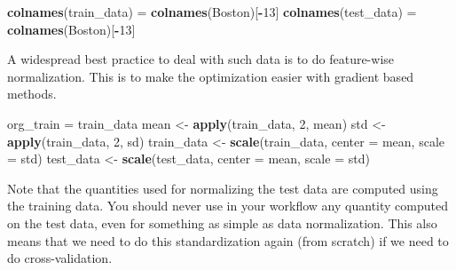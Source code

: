 \documentclass[10pt,ignorenonframetext,]{beamer}
\newenvironment{Shaded}{\begin{snugshade}}{\end{snugshade}}
\newcommand{\KeywordTok}[1]{\textcolor[rgb]{0.13,0.29,0.53}{\textbf{#1}}}
\newcommand{\DataTypeTok}[1]{\textcolor[rgb]{0.13,0.29,0.53}{#1}}
\newcommand{\DecValTok}[1]{\textcolor[rgb]{0.00,0.00,0.81}{#1}}
\newcommand{\StringTok}[1]{\textcolor[rgb]{0.31,0.60,0.02}{#1}}
\newcommand{\OperatorTok}[1]{\textcolor[rgb]{0.81,0.36,0.00}{\textbf{#1}}}
\newcommand{\NormalTok}[1]{#1}
\begin{document}
\begin{frame}[fragile]
\begin{Shaded}
\begin{Highlighting}[]
\KeywordTok{colnames}\NormalTok{(train_data) =}\StringTok{ }\KeywordTok{colnames}\NormalTok{(Boston)[}\OperatorTok{-}\DecValTok{13}\NormalTok{]}
\KeywordTok{colnames}\NormalTok{(test_data) =}\StringTok{ }\KeywordTok{colnames}\NormalTok{(Boston)[}\OperatorTok{-}\DecValTok{13}\NormalTok{]}
\end{Highlighting}
\end{Shaded}

\end{frame}

\begin{frame}[fragile]

A widespread best practice to deal with such data is to do feature-wise
normalization. This is to make the optimization easier with gradient
based methods.

\begin{Shaded}
\begin{Highlighting}[]
\NormalTok{org_train =}\StringTok{ }\NormalTok{train_data}
\NormalTok{mean <-}\StringTok{ }\KeywordTok{apply}\NormalTok{(train_data, }\DecValTok{2}\NormalTok{, mean)}
\NormalTok{std <-}\StringTok{ }\KeywordTok{apply}\NormalTok{(train_data, }\DecValTok{2}\NormalTok{, sd)}
\NormalTok{train_data <-}\StringTok{ }\KeywordTok{scale}\NormalTok{(train_data, }\DataTypeTok{center =}\NormalTok{ mean, }\DataTypeTok{scale =}\NormalTok{ std)}
\NormalTok{test_data <-}\StringTok{ }\KeywordTok{scale}\NormalTok{(test_data, }\DataTypeTok{center =}\NormalTok{ mean, }\DataTypeTok{scale =}\NormalTok{ std)}
\end{Highlighting}
\end{Shaded}

Note that the quantities used for normalizing the test data are computed
using the training data. You should never use in your workflow any
quantity computed on the test data, even for something as simple as data
normalization. This also means that we need to do this standardization
again (from scratch) if we need to do cross-validation.

\end{frame}
\end{document}

